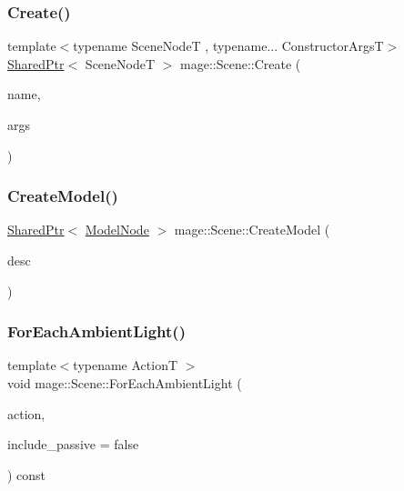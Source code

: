 \subsubsection{\texorpdfstring{Create()}{Create()}}
{\footnotesize\ttfamily template$<$typename Scene\+NodeT , typename... Constructor\+ArgsT$>$ \\
\hyperlink{namespacemage_a1e01ae66713838a7a67d30e44c67703e}{Shared\+Ptr}$<$ Scene\+NodeT $>$ mage\+::\+Scene\+::\+Create (\begin{DoxyParamCaption}\item[{string}]{name,  }\item[{Constructor\+ArgsT \&\&...}]{args }\end{DoxyParamCaption})}

\hypertarget{classmage_1_1_scene_a9d6c27c761cd4535549c8af2e3804b7d}{}\label{classmage_1_1_scene_a9d6c27c761cd4535549c8af2e3804b7d} 
\subsubsection{\texorpdfstring{Create\+Model()}{CreateModel()}}
{\footnotesize\ttfamily \hyperlink{namespacemage_a1e01ae66713838a7a67d30e44c67703e}{Shared\+Ptr}$<$ \hyperlink{classmage_1_1_model_node}{Model\+Node} $>$ mage\+::\+Scene\+::\+Create\+Model (\begin{DoxyParamCaption}\item[{const \hyperlink{classmage_1_1_model_descriptor}{Model\+Descriptor} \&}]{desc }\end{DoxyParamCaption})}

\hypertarget{classmage_1_1_scene_a0b05bd65003dfb02124dd00762950a16}{}\label{classmage_1_1_scene_a0b05bd65003dfb02124dd00762950a16} 
\subsubsection{\texorpdfstring{For\+Each\+Ambient\+Light()}{ForEachAmbientLight()}}
{\footnotesize\ttfamily template$<$typename ActionT $>$ \\
void mage\+::\+Scene\+::\+For\+Each\+Ambient\+Light (\begin{DoxyParamCaption}\item[{ActionT}]{action,  }\item[{bool}]{include\+\_\+passive = {\ttfamily false} }\end{DoxyParamCaption}) const}

